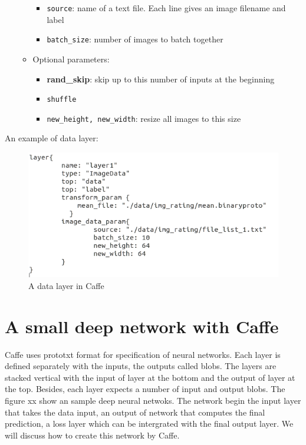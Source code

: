 \begin{itemize}
\begin{itemize}
				\begin{itemize}
					\item \texttt{source}: name of a text file. Each line gives an image filename and label
					\item \texttt{batch\_size}: number of images to batch together
				\end{itemize}
			\item Optional parameters:
				\begin{itemize}
					\item \textbf{rand\_skip}: skip up to this number of inputs at the beginning
					\item \texttt{shuffle}
					\item \texttt{new\_height, new\_width}: resize all images to this size
				\end{itemize}
		\end{itemize}
\end{itemize}
An example of data layer:
\begin{figure}[!h]
	\centering
	\includegraphics[scale=0.65]{images/stdata}
	\caption{A data layer in Caffe}
	\label{figstdata}
\end{figure}
\fi

\section{A small deep network with Caffe}
Caffe uses prototxt format for specification of neural networks. Each layer is defined separately with the inputs, the outputs called blobs. The layers are stacked vertical with the input of layer at the bottom and the output of layer at the top. Besides, each layer expects a number of input and output blobs. The figure xx show an sample deep neural netwoks. The network begin the input layer that takes the data input, an output of network that computes the final prediction, a loss layer which can be intergrated with the final output layer. We will discuss how to create this network by Caffe.\\[0.2cm]

